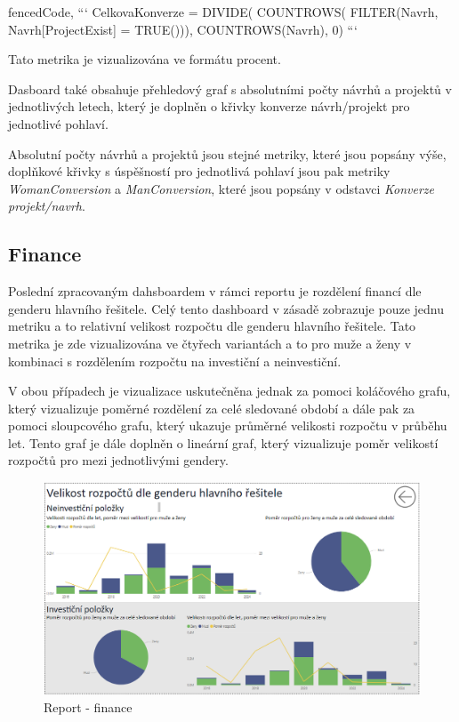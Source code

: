 \documentclass[
  digital,     %
  twoside,     %
  lof,         %
  lot,         %
]{fithesis4}
\begin{document}
\begin{markdown*}{%
  fencedCode,
}
```
CelkovaKonverze = DIVIDE(
                    COUNTROWS(
                        FILTER(Navrh, Navrh[ProjectExist] = TRUE())),
                        COUNTROWS(Navrh),
                        0)
```
\end{markdown*}
Tato metrika je vizualizována ve formátu procent.


Dasboard také obsahuje přehledový graf s absolutními počty návrhů a projektů v jednotlivých letech, který je doplněn o křivky konverze návrh/projekt pro jednotlivé pohlaví.

Absolutní počty návrhů a projektů jsou stejné metriky, které jsou popsány výše, doplňkové křivky s úspěšností pro jednotlivá pohlaví jsou pak metriky \emph{WomanConversion} a \emph{ManConversion}, které jsou popsány v odstavci \emph{Konverze projekt/navrh}.

\subsection{Finance}
Poslední zpracovaným dahsboardem v rámci reportu je rozdělení financí dle genderu hlavního řešitele. Celý tento dashboard v zásadě zobrazuje pouze jednu metriku a to relativní velikost rozpočtu dle genderu hlavního řešitele. Tato metrika je zde vizualizována ve čtyřech variantách a to pro muže a ženy v kombinaci s rozdělením rozpočtu na investiční a neinvestiční.  

V obou případech je vizualizace uskutečněna jednak za pomoci koláčového grafu, který vizualizuje poměrné rozdělení za celé sledované období a dále pak za pomoci sloupcového grafu, který ukazuje průměrné velikosti rozpočtu v průběhu let. Tento graf je dále doplněn o lineární graf, který vizualizuje poměr velikostí rozpočtů pro mezi jednotlivými gendery.

    \begin{figure}[t]
        \begin{center}
            \includegraphics[width=13cm]{img/finance.png}
        \end{center}
        \caption{Report - finance}
        \label{fig:finance}
    \end{figure}
\end{document}
